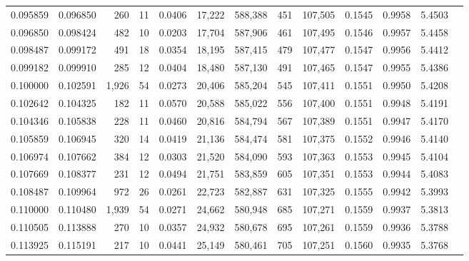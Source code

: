 \begin{tabular}{rrrrrrrrrrrrr}
0.095859 & 0.096850 &   260 &  11 &                                     0.0406 &  17,222 & 588,388 &     451 & 107,505 & 0.1545 & 0.9958 & 5.4503 \\
0.096850 & 0.098424 &   482 &  10 &                                     0.0203 &  17,704 & 587,906 &     461 & 107,495 & 0.1546 & 0.9957 & 5.4458 \\
0.098487 & 0.099172 &   491 &  18 &                                     0.0354 &  18,195 & 587,415 &     479 & 107,477 & 0.1547 & 0.9956 & 5.4412 \\
0.099182 & 0.099910 &   285 &  12 &                                     0.0404 &  18,480 & 587,130 &     491 & 107,465 & 0.1547 & 0.9955 & 5.4386 \\
0.100000 & 0.102591 & 1,926 &  54 &                                     0.0273 &  20,406 & 585,204 &     545 & 107,411 & 0.1551 & 0.9950 & 5.4208 \\
0.102642 & 0.104325 &   182 &  11 &                                     0.0570 &  20,588 & 585,022 &     556 & 107,400 & 0.1551 & 0.9948 & 5.4191 \\
0.104346 & 0.105838 &   228 &  11 &                                     0.0460 &  20,816 & 584,794 &     567 & 107,389 & 0.1551 & 0.9947 & 5.4170 \\
0.105859 & 0.106945 &   320 &  14 &                                     0.0419 &  21,136 & 584,474 &     581 & 107,375 & 0.1552 & 0.9946 & 5.4140 \\
0.106974 & 0.107662 &   384 &  12 &                                     0.0303 &  21,520 & 584,090 &     593 & 107,363 & 0.1553 & 0.9945 & 5.4104 \\
0.107669 & 0.108377 &   231 &  12 &                                     0.0494 &  21,751 & 583,859 &     605 & 107,351 & 0.1553 & 0.9944 & 5.4083 \\
0.108487 & 0.109964 &   972 &  26 &                                     0.0261 &  22,723 & 582,887 &     631 & 107,325 & 0.1555 & 0.9942 & 5.3993 \\
0.110000 & 0.110480 & 1,939 &  54 &                                     0.0271 &  24,662 & 580,948 &     685 & 107,271 & 0.1559 & 0.9937 & 5.3813 \\
0.110505 & 0.113888 &   270 &  10 &                                     0.0357 &  24,932 & 580,678 &     695 & 107,261 & 0.1559 & 0.9936 & 5.3788 \\
0.113925 & 0.115191 &   217 &  10 &                                     0.0441 &  25,149 & 580,461 &     705 & 107,251 & 0.1560 & 0.9935 & 5.3768 \\

\end{tabular}
